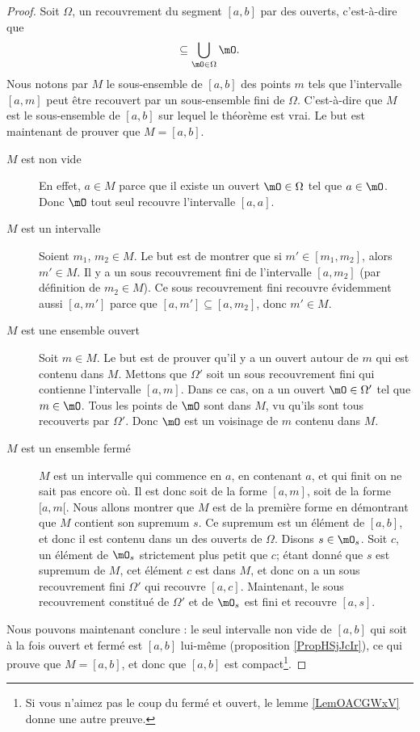 \begin{proof}
    Soit $\Omega$, un recouvrement du segment $[a,b]$ par des ouverts, c'est-à-dire que
    \begin{equation}
        [a,b]\subseteq\bigcup_{\mO\in\Omega}\mO.
    \end{equation}
    Nous notons par $M$ le sous-ensemble de $[a,b]$ des points $m$ tels que l'intervalle $[a,m]$ peut être recouvert par un sous-ensemble fini de $\Omega$. C'est-à-dire que $M$ est le sous-ensemble de $[a,b]$ sur lequel le théorème est vrai. Le but est maintenant de prouver que $M=[a,b]$.
    \begin{description}
        \item[$M$ est non vide] En effet, $a\in M$ parce que il existe un ouvert $\mO\in\Omega$ tel que $a\in\mO$. Donc $\mO$ tout seul recouvre l'intervalle $[a,a]$.
        \item[$M$ est un intervalle] Soient $m_1$, $m_2\in M$. Le but est de montrer que si $m'\in[m_1,m_2]$, alors $m'\in M$. Il y a un sous recouvrement fini de l'intervalle $[a,m_2]$ (par définition de $m_2\in M$). Ce sous recouvrement fini recouvre évidemment aussi $[a,m']$ parce que $[a,m']\subseteq [a,m_2]$, donc $m'\in M$.
        \item[$M$ est une ensemble ouvert] Soit $m\in M$. Le but est de prouver qu'il y a un ouvert autour de $m$ qui est contenu dans $M$. Mettons que $\Omega'$ soit un sous recouvrement fini qui contienne l'intervalle $[a,m]$. Dans ce cas, on a un ouvert $\mO\in\Omega'$ tel que $m\in\mO$. Tous les points de $\mO$ sont dans $M$, vu qu'ils sont tous recouverts par $\Omega'$. Donc $\mO$ est un voisinage de $m$ contenu dans $M$.
        \item[$M$ est un ensemble fermé] $M$ est un intervalle qui commence en $a$, en contenant $a$, et qui finit on ne sait pas encore où. Il est donc soit de la forme $[a,m]$, soit de la forme $[a,m[$. Nous allons montrer que $M$ est de la première forme en démontrant que $M$ contient son supremum $s$. Ce supremum est un élément de $[a,b]$, et donc il est contenu dans un des ouverts de $\Omega$. Disons $s\in\mO_s$. Soit $c$, un élément de $\mO_s$ strictement plus petit que $c$; étant donné que $s$ est supremum de $M$, cet élément $c$ est dans $M$, et donc on a un sous recouvrement fini $\Omega'$ qui recouvre $[a,c]$. Maintenant, le sous recouvrement constitué de $\Omega'$ et de $\mO_s$ est fini et recouvre $[a,s]$.
    \end{description}
    Nous pouvons maintenant conclure : le seul intervalle non vide de $[a,b]$ qui soit à la fois ouvert et fermé est $[a,b]$ lui-même (proposition \ref{PropHSjJcIr}), ce qui prouve que $M=[a,b]$, 
    et donc que $[a,b]$ est compact\footnote{Si vous n'aimez pas le coup du fermé et ouvert, le lemme \ref{LemOACGWxV} donne une autre preuve.}.
\end{proof}


